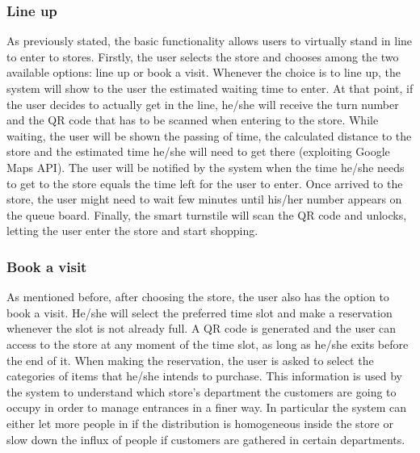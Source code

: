 \documentclass{article}
\begin{document}
\subsubsection{Line up} 
As previously stated, the basic functionality allows users to virtually stand in line to enter to stores. Firstly, the user selects the store and chooses among the two available options: line up or book a visit. Whenever the choice is to line up, the system will show to the user the estimated waiting time to enter. At that point, if the user decides to actually get in the line, he/she will receive the turn number and the QR code that has to be scanned when entering to the store. While waiting, the user will be shown the passing of time, the calculated distance to the store and the estimated time he/she will need to get there (exploiting Google Maps API). The user will be notified by the system when the time he/she needs to get to the store equals the time left for the user to enter. Once arrived to the store, the user might need to wait few minutes until his/her number appears on the queue board. Finally, the smart turnstile will scan the QR code and unlocks, letting the user enter the store and start shopping.
\subsubsection{Book a visit} 
As mentioned before, after choosing the store, the user also has the option to book a visit. He/she will select the preferred time slot and make a reservation whenever the slot is not already full. A QR code is generated and the user can access to the store at any moment of the time slot, as long as he/she exits before the end of it. When making the reservation, the user is asked to select the categories of items that he/she intends to purchase. This information is used by the system to understand which store’s department the customers are going to occupy in order to manage entrances in a finer way. In particular the system can either let more people in if the distribution is homogeneous inside the store or slow down the influx of people if customers are gathered in certain departments.
\end{document}
